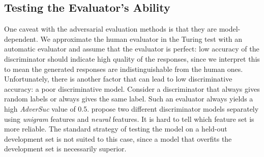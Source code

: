 \subsection{Testing the Evaluator's Ability}
One caveat  with the adversarial evaluation methods is that 
they are model-dependent. 
We approximate the human evaluator in the Turing test with an automatic evaluator and assume that the evaluator is perfect: low accuracy of the discriminator should indicate high quality of the responses, since we interpret this to mean the generated responses are indistinguishable from the human ones. Unfortunately, there is another factor that can lead to low discriminative accuracy: a poor discriminative model. 
 Consider a  discriminator that always gives random labels or always gives the same label.
 Such an evaluator 
   always yields a high {\it AdverSuc} value of 0.5. 
    propose  two different discriminator models 
separately using {\it unigram} features and {\it neural} features. It is hard to tell which feature set is more reliable. 
The standard strategy of testing the model on a held-out development set is not suited to this case, since a model that overfits the development set is necessarily superior. 

